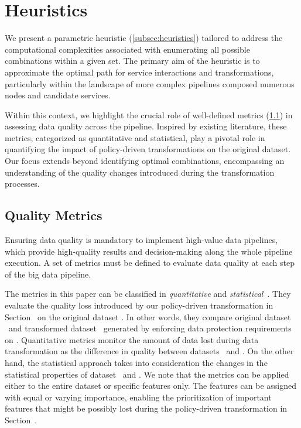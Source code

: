 \section{Heuristics}\label{sec:heuristics}

We present a parametric heuristic (\cref{subsec:heuristics}) tailored to address the computational complexities associated with enumerating all possible combinations within a given set.
The primary aim of the heuristic is to approximate the optimal path for service interactions and transformations, particularly within the landscape of more complex pipelines composed numerous nodes and candidate services.

Within this context, we highlight the crucial role of well-defined metrics (\cref{sec:metrics}) in assessing data quality across the pipeline.
Inspired by existing literature, these metrics, categorized as quantitative and statistical, play a pivotal role in quantifying the impact of policy-driven transformations on the original dataset.
Our focus extends beyond identifying optimal combinations, encompassing an understanding of the quality changes introduced during the transformation processes.


\subsection{Quality Metrics}\label{sec:metrics}


Ensuring data quality is mandatory to implement high-value data pipelines, which provide high-quality results and decision-making along the whole pipeline execution.
A set of metrics must be defined to evaluate data quality at each step of the big data pipeline.

The metrics in this paper can be classified in \emph{quantitative} and \emph{statistical}~\cite{ADD}.
They evaluate the quality loss introduced by our policy-driven transformation in Section~\cite{ADD} on the original dataset \origdataset.
In other words, they compare original dataset \origdataset\ and transformed dataset \transdataset\ generated by enforcing data protection requirements on \origdataset.
Quantitative metrics monitor the amount of data lost during data transformation as the difference in quality between datasets \origdataset\ and \transdataset.
On the other hand, the statistical approach takes into consideration the changes in the statistical properties of dataset \origdataset\ and \transdataset.
We note that the metrics can be applied either to the entire dataset or specific features only.
The features can be assigned with equal or varying importance, enabling the prioritization of important features that might be possibly lost during the policy-driven transformation in Section~\cite{ADD}.

